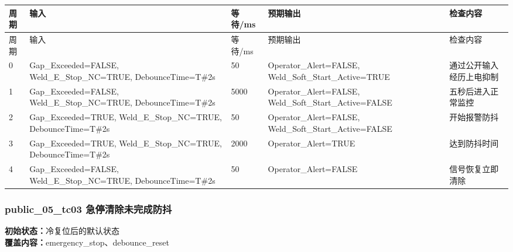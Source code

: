 \begin{longtable}{L{1.0cm}L{4.7cm}L{1.4cm}L{4.0cm}L{2.1cm}}

\toprule

周期 & 输入 & 等待/ms & 预期输出 & 检查内容\\

\midrule

\endfirsthead

\toprule

周期 & 输入 & 等待/ms & 预期输出 & 检查内容\\

\midrule

\endhead

0 & Gap\_Exceeded=FALSE, Weld\_E\_Stop\_NC=TRUE, DebounceTime=T\#2s & 50 & Operator\_Alert=FALSE, Weld\_Soft\_Start\_Active=TRUE & 通过公开输入经历上电抑制\\

1 & Gap\_Exceeded=FALSE, Weld\_E\_Stop\_NC=TRUE, DebounceTime=T\#2s & 5000 & Operator\_Alert=FALSE, Weld\_Soft\_Start\_Active=FALSE & 五秒后进入正常监控\\

2 & Gap\_Exceeded=TRUE, Weld\_E\_Stop\_NC=TRUE, DebounceTime=T\#2s & 50 & Operator\_Alert=FALSE, Weld\_Soft\_Start\_Active=FALSE & 开始报警防抖\\

3 & Gap\_Exceeded=TRUE, Weld\_E\_Stop\_NC=TRUE, DebounceTime=T\#2s & 2000 & Operator\_Alert=TRUE & 达到防抖时间\\

4 & Gap\_Exceeded=FALSE, Weld\_E\_Stop\_NC=TRUE, DebounceTime=T\#2s & 50 & Operator\_Alert=FALSE & 信号恢复立即清除\\

\bottomrule

\end{longtable}

\subsubsection{{\ttfamily public\_05\_tc03} 急停清除未完成防抖}

\noindent\textbf{初始状态：}冷复位后的默认状态\\

\textbf{覆盖内容：}emergency\_stop、debounce\_reset

